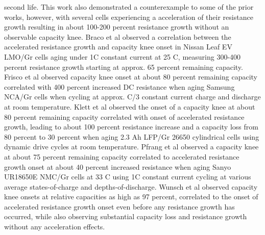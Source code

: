 \documentclass{article}
\begin{document}
second life. This work also demonstrated a counterexample to some of the prior works, however, with several cells experiencing a acceleration of their resistance growth resulting in about 100-200 percent resistance growth without an observable capacity knee. Braco et al \cite{braco_experimental_2020} observed a correlation between the accelerated resistance growth and capacity knee onset in Nissan Leaf EV LMO/Gr cells aging under 1C constant current at 25 C, measuring 300-400 percent resistance growth starting at approx. 65 percent remaining capacity. Frisco et al \cite{frisco_understanding_2016} observed capacity knee onset at about 80 percent remaining capacity correlated with 400 percent increased DC resistance when aging Samsung NCA/Gr cells when cycling at approx. C/3 constant current charge and discharge at room temperature.  Klett et al \cite{klett_non-uniform_2014} observed the onset of a capacity knee at about 80 percent remaining capacity correlated with onset of accelerated resistance growth, leading to about 100 percent resistance increase and a capacity loss from 80 percent to 30 percent when aging 2.3 Ah LFP/Gr 26650 cylindrical cells using dynamic drive cycles at room temperature. Pfrang et al \cite{pfrang_long-term_2018} observed a capacity knee at about 75 percent remaining capacity correlated to accelerated resistance growth onset at about 40 percent increased resistance when aging Sanyo UR18650E NMC/Gr cells at 33 C using 1C constant current cycling at various average states-of-charge and depths-of-discharge. Wunsch et al \cite{wunsch_investigation_2019} observed capacity knee onsets at relative capacities as high as 97 percent, correlated to the onset of accelerated resistance growth onset even before any resistance growth has occurred, while also observing substantial capacity loss and resistance growth without any acceleration effects.
\end{document}
